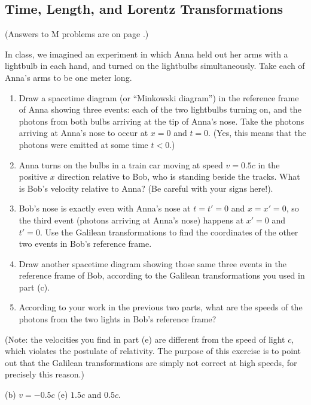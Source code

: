 \subsection{Time, Length, and Lorentz Transformations} 

(Answers to M problems are on page \pageref{lorentz_prob_answers}.)

\begin{Exercise}
In class, we imagined an experiment in which Anna held out her arms with a lightbulb in each hand, and turned on the lightbulbs simultaneously.  Take each of Anna's arms to be one meter long.
\begin{enumerate}[nosep,label=(\alph*)] 
\item Draw a spacetime diagram (or ``Minkowski diagram'') in the reference frame of Anna showing three events: each of the two lightbulbs turning on, and the photons from both bulbs arriving at the tip of Anna's nose.  Take the photons arriving at Anna's nose to occur at $x=0$ and $t=0$.  (Yes, this means that the photons were emitted at some time $t<0$.) 
\item Anna turns on the bulbs in a train car moving at speed $v=0.5c$ in the positive $x$ direction relative to Bob, who is standing beside the tracks.  What is Bob's velocity relative to Anna?  (Be careful with your signs here!).  
\item Bob's nose is exactly even with Anna's nose at $t=t'=0$ and $x=x'=0$, so the third event (photons arriving at Anna's nose) happens at $x'=0$ and $t'=0$.  Use the Galilean transformations to find the coordinates of the other two events in Bob's reference frame.  
\item Draw another spacetime diagram showing those same three events in the reference frame of Bob, according to the Galilean transformations you used in part (c).  
\item According to your work in the previous two parts, what are the speeds of the photons from the two lights in Bob's reference frame? 
\end{enumerate} 
(Note: the velocities you find in part (e) are different from the speed of light $c$, which violates the postulate of relativity.  The purpose of this exercise is to point out that the Galilean transformations are simply not correct at high speeds, for precisely this reason.)
\end{Exercise}
\begin{Answer}
(b) $v=-0.5c$ (e) $1.5c$ and $0.5c$.  
\end{Answer}

